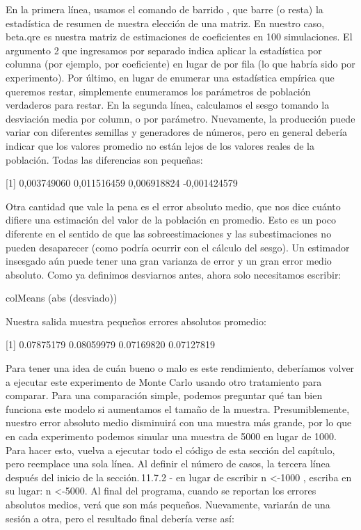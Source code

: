 \documentclass[
]{book}
\begin{document}
En la primera línea, usamos el comando de barrido , que barre (o resta) la estadística de resumen de nuestra elección de una matriz. En nuestro caso, beta.qre es nuestra matriz de estimaciones de coeficientes en 100 simulaciones. El argumento 2 que ingresamos por separado indica aplicar la estadística por columna (por ejemplo, por coeficiente) en lugar de por fila (lo que habría sido por experimento). Por último, en lugar de enumerar una estadística empírica que queremos restar, simplemente enumeramos los parámetros de población verdaderos para restar. En la segunda línea, calculamos el sesgo tomando la desviación media por column, o por parámetro. Nuevamente, la producción puede variar con diferentes semillas y generadores de números, pero en general debería indicar que los valores promedio no están lejos de los valores reales de la población. Todas las diferencias son pequeñas:

{[}1{]} 0,003749060 0,011516459 0,006918824 -0,001424579

Otra cantidad que vale la pena es el error absoluto medio, que nos dice cuánto difiere una estimación del valor de la población en promedio. Esto es un poco diferente en el sentido de que las sobreestimaciones y las subestimaciones no pueden desaparecer (como podría ocurrir con el cálculo del sesgo). Un estimador insesgado aún puede tener una gran varianza de error y un gran error medio absoluto. Como ya definimos desviarnos antes, ahora solo necesitamos escribir:

colMeans (abs (desviado))

Nuestra salida muestra pequeños errores absolutos promedio:

{[}1{]} 0.07875179 0.08059979 0.07169820 0.07127819

Para tener una idea de cuán bueno o malo es este rendimiento, deberíamos volver a ejecutar este experimento de Monte Carlo usando otro tratamiento para comparar. Para una comparación simple, podemos preguntar qué tan bien funciona este modelo si aumentamos el tamaño de la muestra. Presumiblemente, nuestro error absoluto medio disminuirá con una muestra más grande, por lo que en cada experimento podemos simular una muestra de 5000 en lugar de 1000. Para hacer esto, vuelva a ejecutar todo el código de esta sección del capítulo, pero reemplace una sola línea. Al definir el número de casos, la tercera línea después del inicio de la sección. 11.7.2 - en lugar de escribir n \textless-1000 , escriba en su lugar: n \textless-5000. Al final del programa, cuando se reportan los errores absolutos medios, verá que son más pequeños. Nuevamente, variarán de una sesión a otra, pero el resultado final debería verse así:
\end{document}
